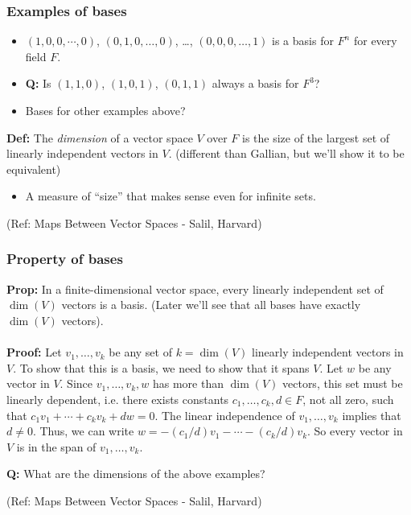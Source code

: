 \begin{frame}[fragile]
\frametitle{Examples of bases}

\begin{itemize}
\item $(1,0,0,\cdots,0)$, $(0,1,0,\ldots,0)$, \ldots, $(0,0,0,\ldots,1)$ is a basis for $F^n$ for every field $F$.
\item \textbf{Q:} Is $(1,1,0)$, $(1,0,1)$, $(0,1,1)$ always a basis for $F^3$?
\item Bases for other examples above?
\end{itemize}

\textbf{Def:}  The {\em dimension} of a vector space $V$ over $F$ is the size of the largest set of linearly independent vectors in $V$.
(different than Gallian, but we'll show it to be equivalent)
\begin{itemize}
\item A measure of ``size'' that makes sense even for infinite sets.
\end{itemize}

\tiny{(Ref: Maps Between Vector Spaces - Salil, Harvard)}
\end{frame}


\begin{frame}[fragile]
\frametitle{Property of bases}

\textbf{Prop:} In a finite-dimensional vector space, every linearly independent set of $\dim(V)$ vectors is a basis.
(Later we'll see that all bases have exactly
$\dim(V)$ vectors).\\
\ \\
\textbf{Proof:} Let $v_1,\ldots,v_k$ be any set of $k=\dim(V)$ linearly independent vectors in $V$.  To show that this is a
basis, we need to show that it spans $V$.  Let $w$ be any vector in $V$.  Since $v_1,\ldots,v_k,w$ has more than $\dim(V)$ vectors, this set must be linearly dependent, i.e. there exists constants $c_1,\ldots,c_k,d\in F$, not all zero, such that $c_1v_1+\cdots+c_kv_k+dw=0$.  The linear
independence of $v_1,\ldots,v_k$ implies that $d\neq 0$.  Thus, we can write $w=-(c_1/d)v_1-\cdots-(c_k/d)v_k$.  So every vector in
$V$ is in the span of $v_1,\ldots,v_k$.

 \textbf{Q:} What are the dimensions of the above examples?


\tiny{(Ref: Maps Between Vector Spaces - Salil, Harvard)}
\end{frame}

